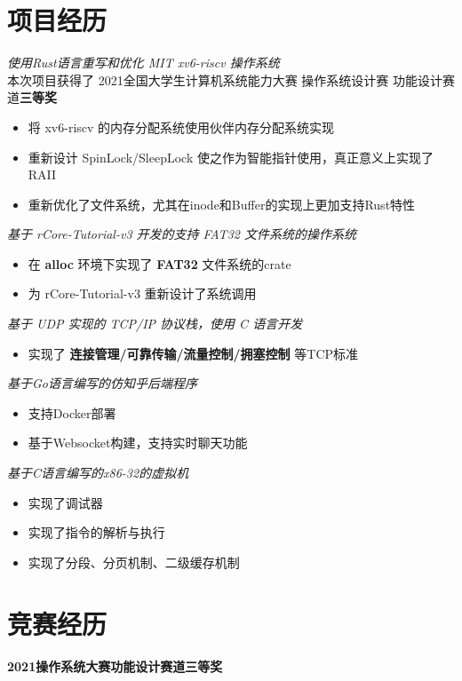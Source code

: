 \documentclass{cv}
\begin{document}

\section{项目经历}

{\it 使用Rust语言重写和优化 MIT xv6-riscv 操作系统}
\vspace{0.4ex}
\\
本次项目获得了 2021全国大学生计算机系统能力大赛 操作系统设计赛 功能设计赛道\textbf{三等奖}
\begin{itemize}
  \item 将 xv6-riscv 的内存分配系统使用伙伴内存分配系统实现
  \item 重新设计 SpinLock/SleepLock 使之作为智能指针使用，真正意义上实现了 RAII
  \item 重新优化了文件系统，尤其在inode和Buffer的实现上更加支持Rust特性
\end{itemize}


{\it 基于 rCore-Tutorial-v3 开发的支持 FAT32 文件系统的操作系统}
\vspace{0.4ex}
\begin{itemize}
  \item 在 \textbf{alloc} 环境下实现了 \textbf{FAT32} 文件系统的crate
  \item 为 rCore-Tutorial-v3 重新设计了系统调用
\end{itemize}


{\it 基于 UDP 实现的 TCP/IP 协议栈，使用 C 语言开发}
\vspace{0.4ex}
\begin{itemize}
  \item 实现了 \textbf{连接管理/可靠传输/流量控制/拥塞控制} 等TCP标准
\end{itemize}


{\it 基于Go语言编写的仿知乎后端程序}
\vspace{0.4ex}
\begin{itemize}
  \item 支持Docker部署
  \item 基于Websocket构建，支持实时聊天功能
\end{itemize}

{\it 基于C语言编写的x86-32的虚拟机}
\vspace{0.4ex}
\begin{itemize}
  \item 实现了调试器
  \item 实现了指令的解析与执行
  \item 实现了分段、分页机制、二级缓存机制
\end{itemize}

\section{竞赛经历}
\textbf{2021操作系统大赛功能设计赛道}\quad \textbf{三等奖}
\end{document}
